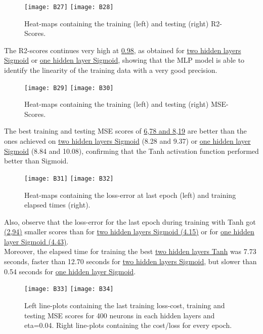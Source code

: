\begin{figure}[H]
\label{fig:B19}
\centering
\texttt{[image: B27]}
\texttt{[image: B28]}
\caption{Heat-maps containing the training (left) and testing (right) R2-Scores.}
\end{figure}

The R2-scores continues very high at \hyperref[fig:B19]{0.98}, as obtained for \hyperref[fig:B11]{two hidden layers Sigmoid} or \hyperref[fig:B2]{one hidden layer Sigmoid}, showing that the MLP model is able to identify the linearity of the training data with a very good precision.

\begin{figure}[H]
\label{fig:B20}
\centering
\texttt{[image: B29]}
\texttt{[image: B30]}
\caption{Heat-maps containing the training (left) and testing (right) MSE-Scores.}
\end{figure}

The best training and testing MSE scores of \hyperref[fig:B20]{6,78 and 8,19} are better than the ones achieved on \hyperref[fig:B12]{two hidden layers Sigmoid} (8.28 and 9.37) or \hyperref[fig:B3]{one hidden layer Sigmoid} (8.84 and 10.08), confirming that the Tanh activation function performed better than Sigmoid.

\begin{figure}[H]
\label{fig:B21}
\centering
\texttt{[image: B31]}
\texttt{[image: B32]}
\caption{Heat-maps containing the loss-error at last epoch (left) and training elapsed times (right).}
\end{figure}

Also, observe that the loss-error for the last epoch during training with Tanh got \hyperref[fig:B21]{(2,94)} smaller scores than for \hyperref[fig:B13]{two hidden layers Sigmoid (4.15)} or for \hyperref[fig:B4]{one hidden layer Sigmoid (4.43)}.\\

Moreover, the elapsed time for training the best \hyperref[fig:B21]{two hidden layers Tanh} was 7.73 seconds, faster than 12.70 seconds for \hyperref[fig:B13]{two hidden layers Sigmoid}, but slower than 0.54 seconds for \hyperref[fig:B4]{one hidden layer Sigmoid}.

\begin{figure}[H]
\label{fig:B22}
\centering
\texttt{[image: B33]}
\texttt{[image: B34]}
\caption{Left line-plots containing the last training loss-cost, training and testing MSE scores for 400 neurons in each hidden layers and eta=0.04. Right line-plots containing the cost/loss for every epoch.}
\end{figure}


